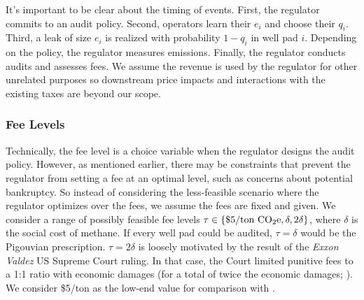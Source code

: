 \documentclass[12pt,oneside,letterpaper]{article}
\theoremstyle{definition}
\begin{document}
\begin{refsection}
It's important to be clear about the timing of events.
First, the regulator commits to an audit policy.
Second, operators learn their \(e_i\) and choose their \(q_i\).
Third, a leak of size \(e_i\) is realized with probability \(1 - q_i\) in well pad \(i\).
Depending on the policy, the regulator measures emissions.
Finally, the regulator conducts audits and assesses fees.
We assume the revenue is used by the regulator for other unrelated purposes so downstream price impacts and interactions with the existing taxes are beyond our scope.

\subsubsection{Fee Levels}
\label{sec:fee-levels}
Technically, the fee level is a choice variable when the regulator designs the audit policy.
However, as mentioned earlier, there may be constraints that prevent the regulator from setting a fee at an optimal level, such as concerns about potential bankruptcy.
So instead of considering the less-feasible scenario where the regulator optimizes over the fees, we assume the fees are fixed and given.
We consider a range of possibly feasible fee levels
\(\tau \in \{\text{\$5/ton \ce{CO2e}}, \delta, 2 \delta\}\), where \(\delta\) is the social cost of methane.
If every well pad could be audited, \(\tau = \delta\) would be the Pigouvian prescription.
\(\tau = 2 \delta\) is loosely motivated by the result of the \textit{Exxon Valdez} US Supreme Court ruling.
In that case, the Court limited punitive fees to a 1:1 ratio with economic damages (for a total of twice the economic damages; \cite{exxon_v_baker:2008}).
We consider \$5/ton  as the low-end value for comparison with \textcite{Marks:2021}.


\end{refsection}
\end{document}
